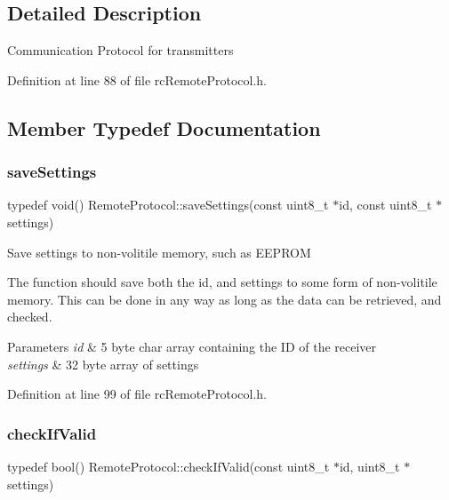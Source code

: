 \subsection{Detailed Description}
Communication Protocol for transmitters 

Definition at line 88 of file rc\+Remote\+Protocol.\+h.



\subsection{Member Typedef Documentation}
\mbox{\label{classRemoteProtocol_ab9e87c74f439c0cadd0823afb1509d55}} 
\subsubsection{\texorpdfstring{save\+Settings}{saveSettings}}
{\footnotesize\ttfamily typedef void() Remote\+Protocol\+::save\+Settings(const uint8\+\_\+t $\ast$id, const uint8\+\_\+t $\ast$settings)}

Save settings to non-\/volitile memory, such as E\+E\+P\+R\+OM

The function should save both the id, and settings to some form of non-\/volitile memory. This can be done in any way as long as the data can be retrieved, and checked.


\begin{DoxyParams}{Parameters}
{\em id} & 5 byte char array containing the ID of the receiver \\
\hline
{\em settings} & 32 byte array of settings \\
\hline
\end{DoxyParams}


Definition at line 99 of file rc\+Remote\+Protocol.\+h.

\mbox{\label{classRemoteProtocol_a6c79a9aff87a0ef816d49e1eda9a639e}} 
\subsubsection{\texorpdfstring{check\+If\+Valid}{checkIfValid}}
{\footnotesize\ttfamily typedef bool() Remote\+Protocol\+::check\+If\+Valid(const uint8\+\_\+t $\ast$id, uint8\+\_\+t $\ast$settings)}

